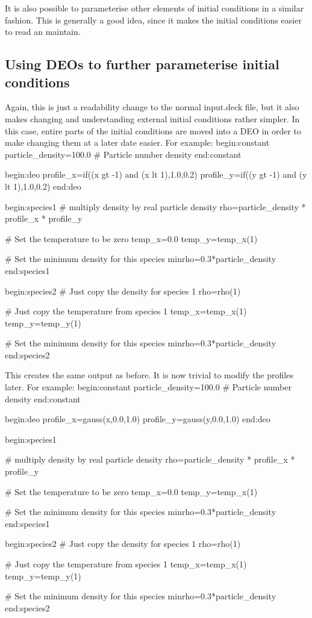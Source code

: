 \documentclass[12pt,a4paper]{article}
\newenvironment{boxverbatim}{\lboxverbatim{none}}{\endlboxverbatim}
\begin{document}
It is also possible to parameterise other elements of initial conditions in a
similar fashion. This is generally a good idea, since it makes the
initial conditions easier to read an maintain.

\subsection{Using DEOs to further parameterise initial conditions}
Again, this is just a readability change to the normal input.deck file, but it
also makes changing and understanding external initial conditions rather
simpler. In this case, entire parts of the initial conditions are moved into a
DEO in order to make changing them at a later date easier. For example:
\begin{boxverbatim}
begin:constant
   particle_density=100.0 # Particle number density
end:constant

begin:deo
   profile_x=if((x gt -1) and (x lt 1),1.0,0.2)
   profile_y=if((y gt -1) and (y lt 1),1.0,0.2)
end:deo

begin:species1
   # multiply density by real particle density
   rho=particle_density * profile_x * profile_y

   # Set the temperature to be zero
   temp_x=0.0
   temp_y=temp_x(1)

   # Set the minimum density for this species
   minrho=0.3*particle_density
end:species1

begin:species2
   # Just copy the density for species 1
   rho=rho(1)

   # Just copy the temperature from species 1
   temp_x=temp_x(1)
   temp_y=temp_y(1)

   # Set the minimum density for this species
   minrho=0.3*particle_density
end:species2
\end{boxverbatim}

This creates the same output as before. It is now trivial to modify the
profiles later. For example:
\begin{boxverbatim}
begin:constant
   particle_density=100.0 # Particle number density
end:constant

begin:deo
   profile_x=gauss(x,0.0,1.0)
   profile_y=gauss(y,0.0,1.0)
end:deo

begin:species1

   # multiply density by real particle density
   rho=particle_density * profile_x * profile_y

   # Set the temperature to be zero
   temp_x=0.0
   temp_y=temp_x(1)

   # Set the minimum density for this species
   minrho=0.3*particle_density
end:species1

begin:species2
   # Just copy the density for species 1
   rho=rho(1)

   # Just copy the temperature from species 1
   temp_x=temp_x(1)
   temp_y=temp_y(1)

   # Set the minimum density for this species
   minrho=0.3*particle_density
end:species2
\end{boxverbatim}
\end{document}
